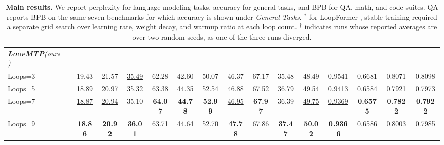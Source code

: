 \begin{table}[t]
{\begin{tabular}{
        @{}l
        c |
        c c |
        c c c c c c c c |
        c c c c@{}
        }
        \midrule
        \rowcolor{lightgray}
        \textit{\textbf{\textsc{LoopMTP}}\small(ours)\normalsize} & \multirow{5}{*}{} &&&&&&&&&&&&&&\\
        \rowcolor{lightgray}
        \quad Loops=3     &   & 19.43 & 21.57 & \underline{35.49} & 62.28 & 42.60 & 50.07 & 46.37 & 67.17 & 35.48 & 48.49 & 0.9541 & 0.6681 & 0.8071 & 0.8098\\
        \rowcolor{lightgray}
        \quad Loops=5 & \multirow{-1}{*}{260M}   & 18.89 & 20.97 & 35.32 & 63.38 & 44.35 & 52.54 & 46.88 & 67.52 & \underline{36.79} & 49.54 & 0.9413 & \underline{0.6584} & \underline{0.7921} & \underline{0.7973}\\
        \rowcolor{lightgray}
        \quad Loops=7     &   & \underline{18.87} & \underline{20.94} & 35.10 & \textbf{64.07} & \textbf{44.78} & \textbf{52.99} & \underline{46.95} & \textbf{67.97} & 36.39 & \underline{49.75} & \underline{0.9369} & \textbf{0.6575} & \textbf{0.7822} & \textbf{0.7922}\\
        \rowcolor{lightgray}
        \quad Loops=9     &  & \textbf{18.86} & \textbf{20.92} & \textbf{36.01} & \underline{63.71} & \underline{44.64} & \underline{52.70} & \textbf{47.78} & \underline{67.86} & \textbf{37.47} & \textbf{50.02} & \textbf{0.9366} & 0.6586 & 0.8003 & 0.7985\\
    \bottomrule
    \end{tabular}
    }
    \vspace{-5pt}
    \caption{\textbf{Main results.} We report perplexity for language modeling tasks, accuracy for general tasks, and BPB for QA, math, and code suites. QA reports BPB on the same seven benchmarks for which accuracy is shown under \textit{General Tasks}.
    $^*$ for LoopFormer \cite{jeddi2026loopformer}, stable training required a separate grid search over learning rate, weight decay, and warmup ratio at each loop count. $^\dagger$ indicates runs whose reported averages are over two random seeds, as one of the three runs diverged.
    }
    \vspace{-10pt}
    \label{tab:main_results}
\end{table}








































